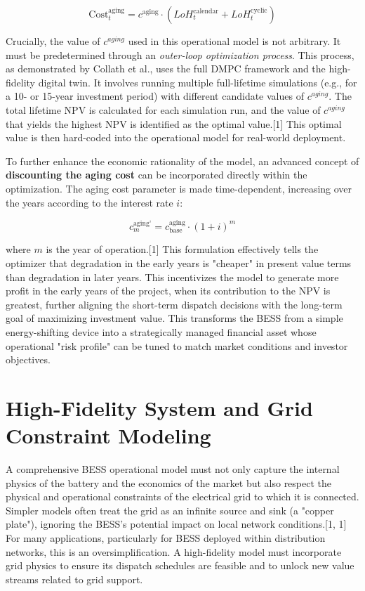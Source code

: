 \begin{equation}
\text{Cost}_{t}^{\text{aging}} = c^{\text{aging}} \cdot (LoH_{t}^{\text{calendar}} + LoH_{t}^{\text{cyclic}})
\end{equation}

Crucially, the value of $c^{aging}$ used in this operational model is not arbitrary. It must be predetermined through an \textit{outer-loop optimization process}. This process, as demonstrated by Collath et al., uses the full DMPC framework and the high-fidelity digital twin. It involves running multiple full-lifetime simulations (e.g., for a 10- or 15-year investment period) with different candidate values of $c^{aging}$. The total lifetime NPV is calculated for each simulation run, and the value of $c^{aging}$ that yields the highest NPV is identified as the optimal value.[1] This optimal value is then hard-coded into the operational model for real-world deployment.

To further enhance the economic rationality of the model, an advanced concept of \textbf{discounting the aging cost} can be incorporated directly within the optimization. The aging cost parameter is made time-dependent, increasing over the years according to the interest rate $i$:

\begin{equation}
c^{\text{aging'}}_{m} = c^{\text{aging}}_{\text{base}} \cdot (1+i)^{m}
\end{equation}

where $m$ is the year of operation.[1] This formulation effectively tells the optimizer that degradation in the early years is "cheaper" in present value terms than degradation in later years. This incentivizes the model to generate more profit in the early years of the project, when its contribution to the NPV is greatest, further aligning the short-term dispatch decisions with the long-term goal of maximizing investment value. This transforms the BESS from a simple energy-shifting device into a strategically managed financial asset whose operational "risk profile" can be tuned to match market conditions and investor objectives.

\section{High-Fidelity System and Grid Constraint Modeling}

A comprehensive BESS operational model must not only capture the internal physics of the battery and the economics of the market but also respect the physical and operational constraints of the electrical grid to which it is connected. Simpler models often treat the grid as an infinite source and sink (a "copper plate"), ignoring the BESS's potential impact on local network conditions.[1, 1] For many applications, particularly for BESS deployed within distribution networks, this is an oversimplification. A high-fidelity model must incorporate grid physics to ensure its dispatch schedules are feasible and to unlock new value streams related to grid support.

